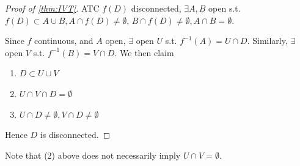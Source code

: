\begin{proof}[Proof of \ref{thm:IVT}]
    ATC $f(D)$ disconnected, 
    $\exists A, B$ open s.t. 
    $f(D) \subset A \cup B, A \cap f(D) \neq \emptyset$, 
    $B \cap f(D) \neq \emptyset, A \cap B = \emptyset$.

    Since $f $ continuous, and $A$ open, $\exists$
    open $U$ s.t. $f^{-1}(A) = U \cap D$. 
    Similarly, $\exists$ open $V$ s.t. $f^{-1}(B) = V \cap D$. 
    We then claim 
    \begin{enumerate}
        \item $D \subset U \cup V$
        \item $U \cap V \cap D = \emptyset$
        \item $U \cap D \neq \emptyset, V \cap D \neq \emptyset$
    \end{enumerate} 
    Hence $D$ is disconnected.
\end{proof}
\begin{remark}
    Note that (2) above does not necessarily
    imply $U \cap V = \emptyset$. 
\end{remark}






























